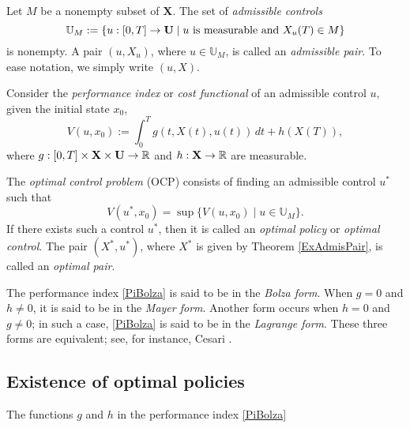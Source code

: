 \begin{assumption} Let $M$ be a nonempty subset of $\mathbf{X}$. 
	The set of {\it admissible controls} 
	\begin{equation}\label{FeasCont}  
		 \mathbb{U}_M:=\{u:[0,T]\to \mathbf{U}\mid u\  
		 \mbox{\rm is measurable and } X_u(T)\in M\} 
	\end{equation}
	is nonempty. A pair $(u,X_u)$, where $u\in \mathbb{U}_M$, is called an 
	{\it admissible pair}. To ease notation, we simply write $(u,X)$.
\end{assumption}


Consider the {\it performance index} or {\it cost functional} of an admissible control $u$, given the initial state $x_0$, 
        \begin{equation}\label{PiBolza} V(u,x_0) := \int_0^Tg(t,X(t),u(t))\,dt + h(X(T)),\end{equation}
where $g:[0,T]\times \mathbf{X}\times \mathbf{U}\to \mathbb{R}$ and $h:\mathbf{X}\to\mathbb{R}$ are measurable.

The {\it optimal control problem} (OCP) consists of finding an admissible control $u^\ast$ such that
\[ V(u^\ast,x_0)=\sup\{ V(u,x_0)\mid u\in \mathbb{U}_M \}.\]
If there exists such a control $u^\ast$, then it is called an {\it optimal policy} or {\it optimal control}. The pair $(X^\ast,u^\ast)$, where $X^\ast$ is given by Theorem \ref{ExAdmisPair}, is called an {\it optimal pair}.



\begin{remark}\rm
The performance index \eqref{PiBolza} is said to be in the {\it Bolza form}. When $g= 0$ and $h\neq 0$, it is said to be in the {\it Mayer form}. Another form occurs when $h= 0$ and $g\neq 0$; in such a case, \eqref{PiBolza} is said to be in the {\it Lagrange form}. These three forms are equivalent; see, for instance, Cesari \cite[Sect. 1.9]{Cesari83}. 
\end{remark} 


\subsection{Existence of optimal policies}




\begin{assumption}
The functions $g$ and $h$ in the performance index \eqref{PiBolza}
 
\end{assumption}










